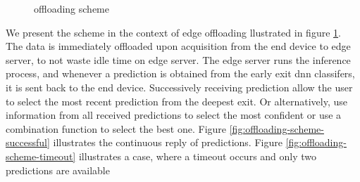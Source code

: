 \begin{figure}
	\captionsetup[subfigure]{justification=centering}
	\centering
\end{figure}
\begin{figure}
		\captionsetup[subfigure]{justification=centering}
	\centering
	\caption[Offloading scheme]{offloading scheme}
	\label{fig:offloading-scheme}
\end{figure} 

We present the scheme in the context of edge offloading llustrated in figure \ref{fig:offloading-scheme}. The data is immediately offloaded upon acquisition from the end device to edge server, to not waste idle time on edge server. The edge server runs the inference process, and whenever a prediction is obtained from the early exit \gls{dnn} classifers, it is sent back to the end device. Successively receiving prediction allow the user to select the most recent prediction from the deepest exit. Or alternatively, use information from all received predictions to select the most confident or use a combination function to select the best one. Figure \ref{fig:offloading-scheme-successful} illustrates the continuous reply of predictions. Figure \ref{fig:offloading-scheme-timeout} illustrates a case, where a timeout occurs and only two predictions are available 

